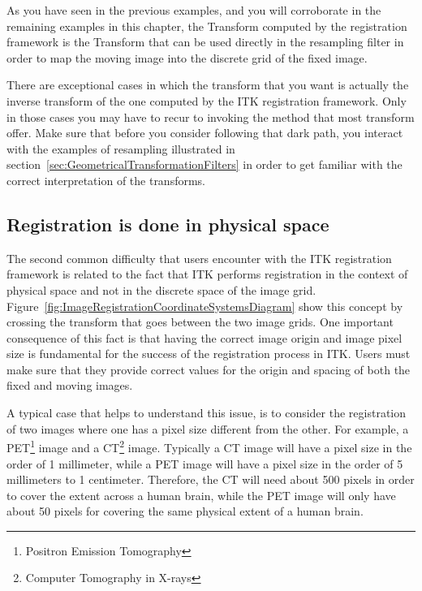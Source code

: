 As you have seen in the previous examples, and you will corroborate in the
remaining examples in this chapter, the Transform computed by the registration
framework is the Transform that can be used directly in the resampling filter
in order to map the moving image into the discrete grid of the fixed image.

There are exceptional cases in which the transform that you want is actually
the inverse transform of the one computed by the ITK registration framework.
Only in those cases you may have to recur to invoking the 
method that most transform offer.  Make sure that before you consider following
that dark path, you interact with the examples of resampling illustrated in
section~\ref{sec:GeometricalTransformationFilters} in order to get familiar
with the correct interpretation of the transforms.


\subsection{Registration is done in physical space}
\label{sec:RegistrationIsDoneInPhysicalSpace}

The second common difficulty that users encounter with the ITK registration
framework is related to the fact that ITK performs registration in the context
of physical space and not in the discrete space of the image grid.
Figure~\ref{fig:ImageRegistrationCoordinateSystemsDiagram} show this concept by
crossing the transform that goes between the two image grids. One important
consequence of this fact is that having the correct image origin and image
pixel size is fundamental for the success of the registration process in ITK.
Users must make sure that they provide correct values for the origin and
spacing of both the fixed and moving images.

A typical case that helps to understand this issue, is to consider the
registration of two images where one has a pixel size different from the other.
For example, a PET\footnote{Positron Emission Tomography} image and a
CT\footnote{Computer Tomography in X-rays} image. Typically a CT image will
have a pixel size in the order of 1 millimeter, while a PET image will have a
pixel size in the order of 5 millimeters to 1 centimeter. Therefore, the CT
will need about 500 pixels in order to cover the extent across a human brain, while
the PET image will only have about 50 pixels for covering the same physical
extent of a human brain.

